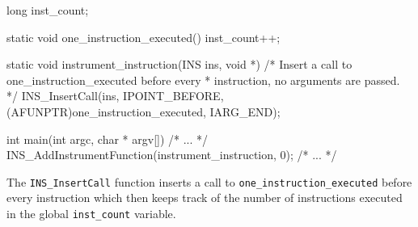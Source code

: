 \begin{ccode}
long inst_count;

static void one_instruction_executed() {
  inst_count++;
}

static void instrument_instruction(INS ins, void *) {
  /* Insert a call to one_instruction_executed before every 
   * instruction, no arguments are passed.  */
  INS_InsertCall(ins, IPOINT_BEFORE, (AFUNPTR)one_instruction_executed, 
                  IARG_END);
}

int main(int argc, char * argv[]) {
  /* ... */
  INS_AddInstrumentFunction(instrument_instruction, 0);
  /* ... */
}
\end{ccode}

The \texttt{INS\_InsertCall} function inserts a call to
\texttt{one\_instruction\_executed} before every instruction which
then keeps track of the number of instructions executed in the global
\texttt{inst\_count} variable.

